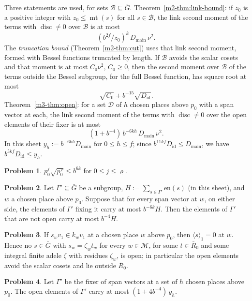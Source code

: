 \documentclass[reqno]{amsart}
\theoremstyle{definition}
\newtheorem{problem}{Problem}[section]
\theoremstyle{plain}
\theoremstyle{remark}
\newcommand{\Gb}{\bar G}
\newcommand{\Rb}{\bar R_0}
\newcommand{\Dc}{\mathcal D}
\newcommand{\Mch}{\mathcal M}
\newcommand{\en}{\mathrm{en}}
\newcommand{\Did}{D_{\mathrm{id}}}
\newcommand{\Dmain}{D_{\mathrm{main}}}
\newcommand{\mt}{\operatorname{mt}}
\begin{document}
Three statements are used, for sets \(\mathcal B\subseteq\Gb\).  Theorem~\ref{m2-thm:link-bound}: if \(z_0\) is a positive integer with \(z_0\le\mt(s)\) for all \(s\in\mathcal B\), the link second moment of the terms with \(\operatorname{disc}\ne0\) over \(\mathcal B\) is at most
\[
 (b^{2f}/z_0)^k\,\Dmain\,\nu^2 .
\]
The \emph{truncation bound} (Theorem~\ref{m2-thm:cut}) uses that link second moment, formed with Bessel functions truncated by length.  If \(\mathcal B\) avoids the scalar cosets and that moment is at most \(C_0\nu^2\), \(C_0\ge0\), then the second moment over \(\mathcal B\) of the terms outside the Bessel subgroup, for the full Bessel function, has square root at most
\[
 \sqrt{C_0}+b^{-15}\sqrt{\Did}.
\]
Theorem~\ref{m3-thm:open}: for a set \(\Dc\) of \(h\) chosen places above \(p_0\) with a span vector at each, the link second moment of the terms with \(\operatorname{disc}\ne0\) over the open elements of their fixer is at most
\[
 (1+b^{-4})\,b^{-6kh}\,\Dmain\,\nu^2 .
\]
In this sheet \(y_h:=b^{-6kh}\Dmain\) for \(0\le h\le f\); since \(b^{11kf}\Did\le\Dmain\), we have \(b^{5kf}\Did\le y_h\).

\begin{problem}\label{pr:exponent}
\(p_0^j\sqrt{p_0^{\,r}}\le b^{6k}\) for \(0\le j\le\varrho\).
\end{problem}

\begin{problem}\label{pr:non-open}
Let \(\Gamma'\subseteq\Gb\) be a subgroup, \(H:=\sum_{s\in\Gamma'}\en(s)\) (in this sheet), and \(w\) a chosen place above \(p_0\).  Suppose that for every span vector at \(w\), on either side, the elements of \(\Gamma'\) fixing it carry at most \(b^{-6k}H\).  Then the elements of \(\Gamma'\) that are not open carry at most \(b^{-4}H\).
\end{problem}

\begin{problem}\label{pr:scalar-not-open}
If \(s_wv_1\in k_wv_1\) at a chosen place \(w\) above \(p_0\), then \(\langle s\rangle_1=0\) at \(w\).  Hence no \(s\in\Gb\) with \(s_w=\zeta_wt_w\) for every \(w\in\Mch\), for some \(t\in\Rb\) and some integral finite adele \(\zeta\) with residues \(\zeta_w\), is open; in particular the open elements avoid the scalar cosets and lie outside \(\Rb\).
\end{problem}

\begin{problem}\label{pr:open-part}
Let \(\Gamma'\) be the fixer of span vectors at a set of \(h\) chosen places above \(p_0\).  The open elements of \(\Gamma'\) carry at most \((1+4b^{-4})\,y_h\).
\end{problem}
\end{document}

